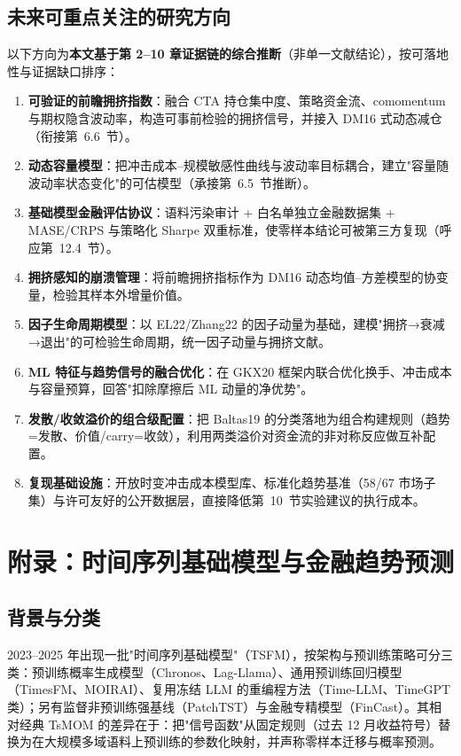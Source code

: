 \documentclass[11pt,a4paper]{article}
\begin{document}
\subsection{未来可重点关注的研究方向}
以下方向为\textbf{本文基于第 2--10 章证据链的综合推断}（非单一文献结论），按可落地性与证据缺口排序：
\begin{enumerate}
\item \textbf{可验证的前瞻拥挤指数}：融合 CTA 持仓集中度、策略资金流、comomentum 与期权隐含波动率，构造可事前检验的拥挤信号，并接入 DM16 式动态减仓（衔接第~6.6~节）。
\item \textbf{动态容量模型}：把冲击成本--规模敏感性曲线与波动率目标耦合，建立"容量随波动率状态变化"的可估模型（承接第~6.5~节推断）。
\item \textbf{基础模型金融评估协议}：语料污染审计 + 白名单独立金融数据集 + MASE/CRPS 与策略化 Sharpe 双重标准，使零样本结论可被第三方复现（呼应第~12.4~节）。
\item \textbf{拥挤感知的崩溃管理}：将前瞻拥挤指标作为 DM16 动态均值--方差模型的协变量，检验其样本外增量价值。
\item \textbf{因子生命周期模型}：以 EL22/Zhang22 的因子动量为基础，建模"拥挤→衰减→退出"的可检验生命周期，统一因子动量与拥挤文献。
\item \textbf{ML 特征与趋势信号的融合优化}：在 GKX20 框架内联合优化换手、冲击成本与容量预算，回答"扣除摩擦后 ML 动量的净优势"。
\item \textbf{发散/收敛溢价的组合级配置}：把 Baltas19 的分类落地为组合构建规则（趋势=发散、价值/carry=收敛），利用两类溢价对资金流的非对称反应做互补配置。
\item \textbf{复现基础设施}：开放时变冲击成本模型库、标准化趋势基准（58/67 市场子集）与许可友好的公开数据层，直接降低第~10~节实验建议的执行成本。
\end{enumerate}

\section{附录：时间序列基础模型与金融趋势预测}\label{sec:appendix}
\subsection{背景与分类}
2023--2025 年出现一批"时间序列基础模型"（TSFM），按架构与预训练策略可分三类：预训练概率生成模型（Chronos、Lag-Llama）、通用预训练回归模型（TimesFM、MOIRAI）、复用冻结 LLM 的重编程方法（Time-LLM、TimeGPT 类）；另有监督非预训练强基线（PatchTST）与金融专精模型（FinCast）。其相对经典 TsMOM 的差异在于：把"信号函数"从固定规则（过去 12 月收益符号）替换为在大规模多域语料上预训练的参数化映射，并声称零样本迁移与概率预测。
\end{document}
